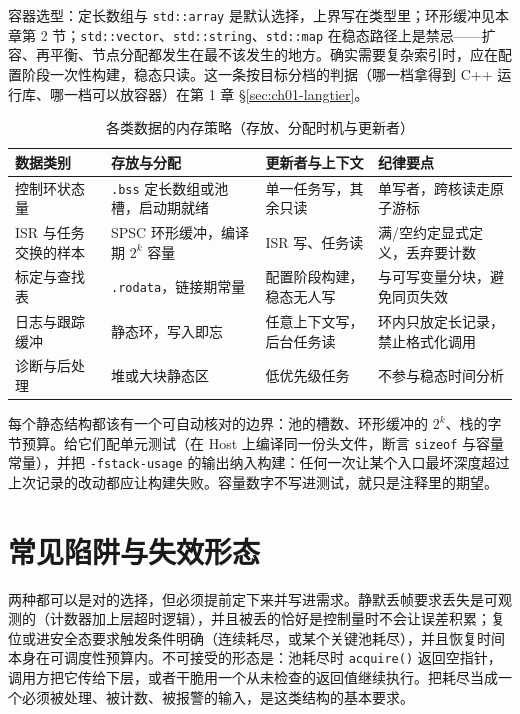 \documentclass[12pt,a4paper,fontset=fandol]{ctexbook}
\newcommand{\Fn}[1]{\texttt{#1()}}
\newcommand{\Tp}[1]{\texttt{#1}}
\newcommand{\Lang}[1]{\textsf{#1}}
\newcommand{\CPP}{\Lang{C++}}
\newcommand{\DomHost}{\Lang{Host}}
\begin{document}
容器选型：定长数组与 \Tp{std::array} 是默认选择，上界写在类型里；环形缓冲见本章第 2 节；\Tp{std::vector}、\Tp{std::string}、\Tp{std::map} 在稳态路径上是禁忌——扩容、再平衡、节点分配都发生在最不该发生的地方。确实需要复杂索引时，应在配置阶段一次性构建，稳态只读。这一条按目标分档的判据（哪一档拿得到 \CPP{} 运行库、哪一档可以放容器）在第 1 章 \S\ref{sec:ch01-langtier}。

\begin{table}[htbp]
\centering
\caption{各类数据的内存策略（存放、分配时机与更新者）}
\label{tab:ch09-mem-policy}
\begin{tabular}{>{\raggedright\arraybackslash}p{} >{\raggedright\arraybackslash}p{} >{\raggedright\arraybackslash}p{} >{\raggedright\arraybackslash}p{}}
\toprule
数据类别 & 存放与分配 & 更新者与上下文 & 纪律要点 \\
\midrule
控制环状态量 & \texttt{.bss} 定长数组或池槽，启动期就绪 & 单一任务写，其余只读 & 单写者，跨核读走原子游标 \\
ISR 与任务交换的样本 & SPSC 环形缓冲，编译期 $2^{k}$ 容量 & ISR 写、任务读 & 满/空约定显式定义，丢弃要计数 \\
标定与查找表 & \texttt{.rodata}，链接期常量 & 配置阶段构建，稳态无人写 & 与可写变量分块，避免同页失效 \\
日志与跟踪缓冲 & 静态环，写入即忘 & 任意上下文写，后台任务读 & 环内只放定长记录，禁止格式化调用 \\
诊断与后处理 & 堆或大块静态区 & 低优先级任务 & 不参与稳态时间分析 \\
\bottomrule
\end{tabular}
\end{table}

\begin{bestpractice}[title={把静态容量变成可回归的数字}]
每个静态结构都该有一个可自动核对的边界：池的槽数、环形缓冲的 $2^{k}$、栈的字节预算。给它们配单元测试（在 \DomHost{} 上编译同一份头文件，断言 \texttt{sizeof} 与容量常量），并把 \texttt{-fstack-usage} 的输出纳入构建：任何一次让某个入口最坏深度超过上次记录的改动都应让构建失败。容量数字不写进测试，就只是注释里的期望。
\end{bestpractice}

\section{常见陷阱与失效形态}

\begin{compare}[title={内存池耗尽：静默丢帧还是复位}]
两种都可以是对的选择，但必须提前定下来并写进需求。静默丢帧要求丢失是可观测的（计数器加上层超时逻辑），并且被丢的恰好是控制量时不会让误差积累；复位或进安全态要求触发条件明确（连续耗尽，或某个关键池耗尽），并且恢复时间本身在可调度性预算内。不可接受的形态是：池耗尽时 \Fn{acquire} 返回空指针，调用方把它传给下层，或者干脆用一个从未检查的返回值继续执行。把耗尽当成一个必须被处理、被计数、被报警的输入，是这类结构的基本要求。
\end{compare}
\end{document}
